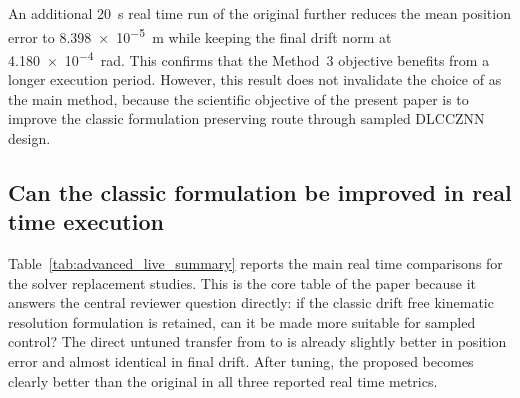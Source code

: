 An additional \SI{20}{\second} real time run of the original \methodthree{} further reduces the mean position error to \SI{8.398e-5}{\meter} while keeping the final drift norm at \SI{4.180e-4}{\radian}. This confirms that the Method~3 objective benefits from a longer execution period. However, this result does not invalidate the choice of \methodtwoDL{} as the main method, because the scientific objective of the present paper is to improve the classic formulation preserving route through sampled DLCCZNN design.

\subsection{Can the classic formulation be improved in real time execution}

Table~\ref{tab:advanced_live_summary} reports the main real time comparisons for the solver replacement studies. This is the core table of the paper because it answers the central reviewer question directly: if the classic drift free kinematic resolution formulation is retained, can it be made more suitable for sampled control? The direct untuned transfer from \methodtwo{} to \methodtwoDL{} is already slightly better in position error and almost identical in final drift. After tuning, the proposed \methodtwoDL{} becomes clearly better than the original \methodtwo{} in all three reported real time metrics.


